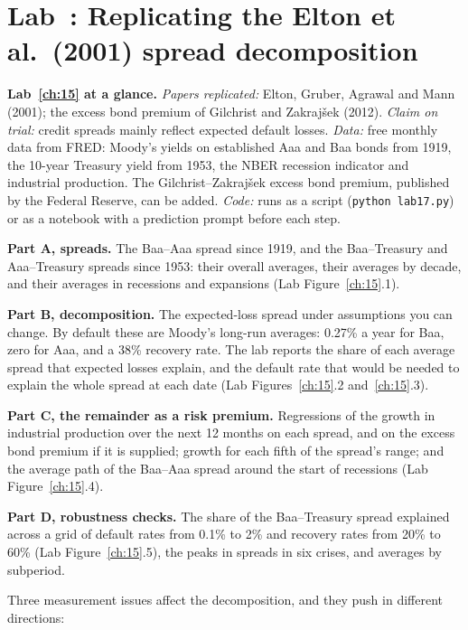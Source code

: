 \section{Lab~\thechapter: Replicating the Elton et al.\ (2001) spread decomposition}
\label{sec:15-lab}

\begin{callout}
\textbf{Lab~\ref{ch:15} at a glance.} \emph{Papers replicated:} Elton, Gruber, Agrawal and Mann (2001); the excess bond premium of Gilchrist and Zakraj\v{s}ek (2012). \emph{Claim on trial:} credit spreads mainly reflect expected default losses. \emph{Data:} free monthly data from FRED: Moody's yields on established Aaa and Baa bonds from 1919, the 10-year Treasury yield from 1953, the NBER recession indicator and industrial production. The Gilchrist--Zakraj\v{s}ek excess bond premium, published by the Federal Reserve, can be added. \emph{Code:} runs as a script (\texttt{python lab17.py}) or as a notebook with a prediction prompt before each step.
\end{callout}

\textbf{Part A, spreads.} The Baa--Aaa spread since 1919, and the Baa--Treasury and Aaa--Treasury spreads since 1953: their overall averages, their averages by decade, and their averages in recessions and expansions (Lab Figure~\ref{ch:15}.1).

\textbf{Part B, decomposition.} The expected-loss spread under assumptions you can change. By default these are Moody's long-run averages: 0.27\% a year for Baa, zero for Aaa, and a 38\% recovery rate. The lab reports the share of each average spread that expected losses explain, and the default rate that would be needed to explain the whole spread at each date (Lab Figures~\ref{ch:15}.2 and~\ref{ch:15}.3).

\textbf{Part C, the remainder as a risk premium.} Regressions of the growth in industrial production over the next 12 months on each spread, and on the excess bond premium if it is supplied; growth for each fifth of the spread's range; and the average path of the Baa--Aaa spread around the start of recessions (Lab Figure~\ref{ch:15}.4).

\textbf{Part D, robustness checks.} The share of the Baa--Treasury spread explained across a grid of default rates from 0.1\% to 2\% and recovery rates from 20\% to 60\% (Lab Figure~\ref{ch:15}.5), the peaks in spreads in six crises, and averages by subperiod.

Three measurement issues affect the decomposition, and they push in different directions:

